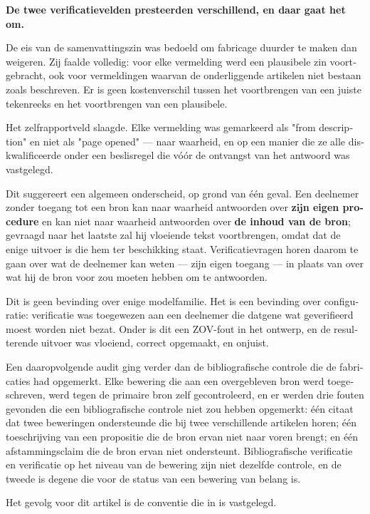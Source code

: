 \begin{dutch}
\textbf{De twee verificatievelden presteerden verschillend, en daar gaat het om.}

De eis van de samenvattingszin was bedoeld om fabricage duurder te maken dan weigeren. Zij faalde volledig: voor elke vermelding werd een plausibele zin voortgebracht, ook voor vermeldingen waarvan de onderliggende artikelen niet bestaan zoals beschreven. Er is geen kostenverschil tussen het voortbrengen van een juiste tekenreeks en het voortbrengen van een plausibele.

Het zelfrapportveld slaagde. Elke vermelding was gemarkeerd als "from description" en niet als "page opened" — naar waarheid, en op een manier die ze alle diskwalificeerde onder een beslisregel die vóór de ontvangst van het antwoord was vastgelegd.

Dit suggereert een algemeen onderscheid, op grond van één geval. Een deelnemer zonder toegang tot een bron kan naar waarheid antwoorden over \textbf{zijn eigen procedure} en kan niet naar waarheid antwoorden over \textbf{de inhoud van de bron}; gevraagd naar het laatste zal hij vloeiende tekst voortbrengen, omdat dat de enige uitvoer is die hem ter beschikking staat. Verificatievragen horen daarom te gaan over wat de deelnemer kan weten — zijn eigen toegang — in plaats van over wat hij de bron voor zou moeten hebben om te antwoorden.

Dit is geen bevinding over enige modelfamilie. Het is een bevinding over configuratie: verificatie was toegewezen aan een deelnemer die datgene wat geverifieerd moest worden niet bezat. Onder  is dit een ZOV-fout in het ontwerp, en de resulterende uitvoer was vloeiend, correct opgemaakt, en onjuist.

Een daaropvolgende audit ging verder dan de bibliografische controle die de fabricaties had opgemerkt. Elke bewering die aan een overgebleven bron werd toegeschreven, werd tegen de primaire bron zelf gecontroleerd, en er werden drie fouten gevonden die een bibliografische controle niet zou hebben opgemerkt: één citaat dat twee beweringen ondersteunde die bij twee verschillende artikelen horen; één toeschrijving van een propositie die de bron ervan niet naar voren brengt; en één afstammingsclaim die de bron ervan niet ondersteunt. Bibliografische verificatie en verificatie op het niveau van de bewering zijn niet dezelfde controle, en de tweede is degene die voor de status van een bewering van belang is.

Het gevolg voor dit artikel is de conventie die in  is vastgelegd.



\end{dutch}
